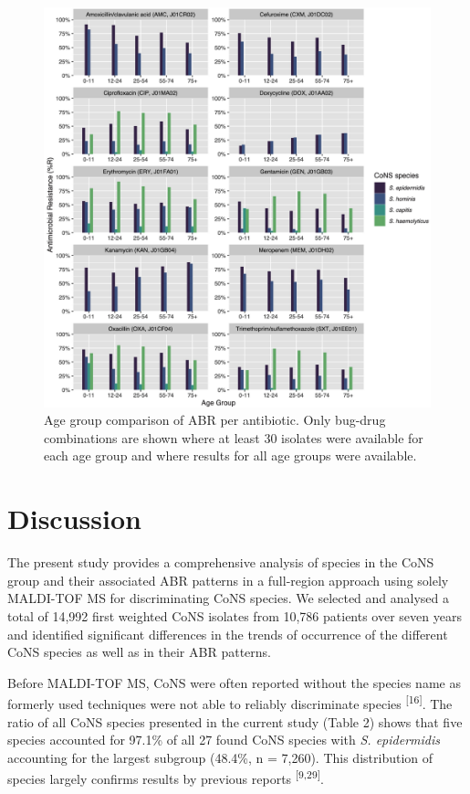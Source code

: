 \documentclass[
]{book}
\begin{document}
\begin{figure}

{\centering \includegraphics[width=1\linewidth]{images/07-04} 

}

\caption{Age group comparison of ABR per antibiotic. Only bug-drug combinations are shown where at least 30 isolates were available for each age group and where results for all age groups were available.}\label{fig:fig7-4}
\end{figure}

\hypertarget{discussion-3}{%
\section{Discussion}\label{discussion-3}}

The present study provides a comprehensive analysis of species in the CoNS group and their associated ABR patterns in a full-region approach using solely MALDI-TOF MS for discriminating CoNS species. We selected and analysed a total of 14,992 first weighted CoNS isolates from 10,786 patients over seven years and identified significant differences in the trends of occurrence of the different CoNS species as well as in their ABR patterns.

Before MALDI-TOF MS, CoNS were often reported without the species name as formerly used techniques were not able to reliably discriminate species \textsuperscript{{[}16{]}}. The ratio of all CoNS species presented in the current study (Table 2) shows that five species accounted for 97.1\% of all 27 found CoNS species with \emph{S. epidermidis} accounting for the largest subgroup (48.4\%, n = 7,260). This distribution of species largely confirms results by previous reports \textsuperscript{{[}9,29{]}}.
\end{document}
